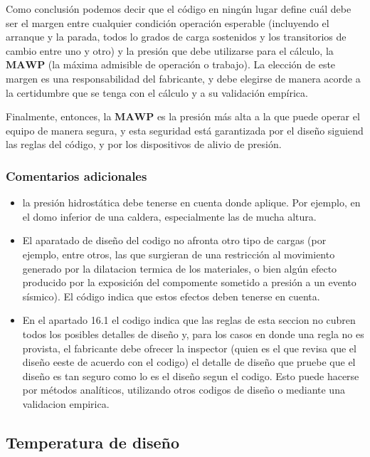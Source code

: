 Como conclusión podemos decir que el código en ningún lugar define cuál debe ser el margen entre cualquier condición operación esperable (incluyendo el arranque y la parada, todos lo grados de carga sostenidos y los transitorios de cambio entre uno y otro) y la presión que debe utilizarse para el cálculo, la $\mathbf{MAWP}$ (la máxima admisible de operación o trabajo). La elección de este margen es una responsabilidad del fabricante, y debe elegirse de manera acorde a la certidumbre que se tenga con el cálculo y a su validación empírica.

Finalmente, entonces, la $\mathbf{MAWP}$ es la presión más alta a la que puede operar el equipo de manera segura, y esta seguridad está garantizada por el diseño siguiend las reglas del código, y por los dispositivos de alivio de presión.

\subsubsection{Comentarios adicionales}

\begin{itemize}
     \item la presión hidrostática debe tenerse en cuenta donde aplique. Por ejemplo, en el domo inferior de una caldera, especialmente las de mucha altura.
     \item El aparatado de diseño del codigo no afronta otro tipo de cargas (por ejemplo, entre otros, las que surgieran de una restricción al movimiento generado por la dilatacion termica de los materiales, o bien algún efecto producido por la exposición del compomente sometido a presión a un evento sísmico). El código indica que estos efectos deben tenerse en cuenta.
     \item En el apartado 16.1 el codigo indica que las reglas de esta seccion no cubren todos los posibles detalles de diseño y, para los casos en donde una regla no es provista, el fabricante debe ofrecer la inspector (quien es el que revisa que el diseño eeste de acuerdo con el codigo) el detalle de diseño que pruebe que el diseño es tan seguro como lo es el diseño segun el codigo. Esto puede hacerse por métodos analíticos, utilizando otros codigos de diseño o mediante una validacion empirica. 
\end{itemize}


\subsection{Temperatura de diseño}

